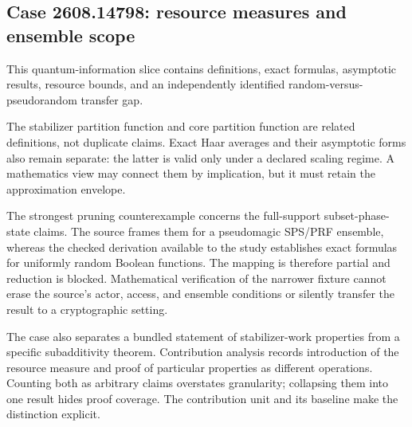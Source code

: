 \subsection{Case 2608.14798: resource measures and ensemble scope}\label{case:contrib-14798}

This quantum-information slice contains definitions, exact formulas, asymptotic results, resource bounds, and an independently identified random-versus-pseudorandom transfer gap.

The stabilizer partition function and core partition function are related definitions, not duplicate claims. Exact Haar averages and their asymptotic forms also remain separate: the latter is valid only under a declared scaling regime. A mathematics view may connect them by implication, but it must retain the approximation envelope.

The strongest pruning counterexample concerns the full-support subset-phase-state claims. The source frames them for a pseudomagic SPS/PRF ensemble, whereas the checked derivation available to the study establishes exact formulas for uniformly random Boolean functions. The mapping is therefore partial and reduction is blocked. Mathematical verification of the narrower fixture cannot erase the source's actor, access, and ensemble conditions or silently transfer the result to a cryptographic setting.

The case also separates a bundled statement of stabilizer-work properties from a specific subadditivity theorem. Contribution analysis records introduction of the resource measure and proof of particular properties as different operations. Counting both as arbitrary claims overstates granularity; collapsing them into one result hides proof coverage. The contribution unit and its baseline make the distinction explicit.